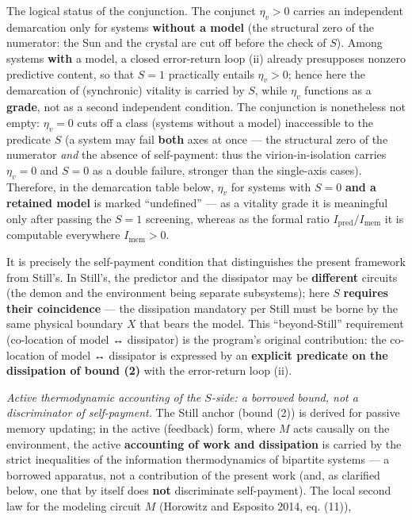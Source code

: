 \documentclass[pdflatex,sn-mathphys-ay]{sn-jnl}
\begin{document}
The logical status of the conjunction. The conjunct \(\eta_v > 0\) carries an independent demarcation only for systems \textbf{without a model} (the structural zero of the numerator: the Sun and the crystal are cut off before the check of \(S\)). Among systems \textbf{with} a model, a closed error-return loop (ii) already presupposes nonzero predictive content, so that \(S = 1\) practically entails \(\eta_v > 0\); hence here the demarcation of (synchronic) vitality is carried by \(S\), while \(\eta_v\) functions as a \textbf{grade}, not as a second independent condition. The conjunction is nonetheless not empty: \(\eta_v = 0\) cuts off a class (systems without a model) inaccessible to the predicate \(S\) (a system may fail \textbf{both} axes at once --- the structural zero of the numerator \emph{and} the absence of self-payment: thus the virion-in-isolation carries \(\eta_v = 0\) and \(S = 0\) as a double failure, stronger than the single-axis cases). Therefore, in the demarcation table below, \(\eta_v\) for systems with \(S = 0\) \textbf{and a retained model} is marked ``undefined'' --- as a vitality grade it is meaningful only after passing the \(S = 1\) screening, whereas as the formal ratio \(I_{\text{pred}}/I_{\text{mem}}\) it is computable everywhere \(I_{\text{mem}} > 0\).

It is precisely the self-payment condition that distinguishes the present framework from Still's. In Still's, the predictor and the dissipator may be \textbf{different} circuits (the demon and the environment being separate subsystems); here \(S\) \textbf{requires their coincidence} --- the dissipation mandatory per Still must be borne by the same physical boundary \(X\) that bears the model. This ``beyond-Still'' requirement (co-location of model ↔ dissipator) is the program's original contribution: the co-location of model ↔ dissipator is expressed by an \textbf{explicit predicate on the dissipation of bound (2)} with the error-return loop (ii).

\emph{Active thermodynamic accounting of the \(S\)-side: a borrowed bound, not a discriminator of self-payment.} The Still anchor (bound (2)) is derived for passive memory updating; in the active (feedback) form, where \(M\) acts causally on the environment, the active \textbf{accounting of work and dissipation} is carried by the strict inequalities of the information thermodynamics of bipartite systems --- a borrowed apparatus, not a contribution of the present work (and, as clarified below, one that by itself does \textbf{not} discriminate self-payment). The local second law for the modeling circuit \(M\) (Horowitz and Esposito 2014, eq. (11)),
\end{document}
